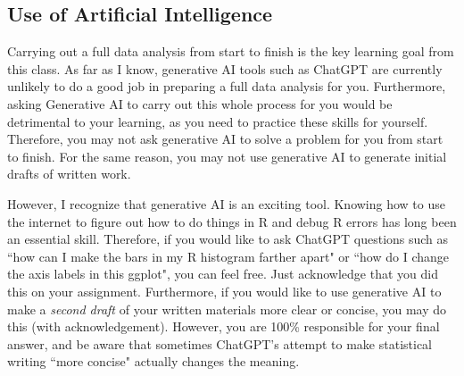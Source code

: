 \documentclass[11pt]{article}
\begin{document}
\subsection{Use of Artificial Intelligence}

Carrying out a full data analysis from start to finish is the key learning goal from this class. As far as I know, generative AI tools such as ChatGPT are currently unlikely to do a good job in preparing a full data analysis for you. Furthermore, asking Generative AI to carry out this whole process for you would be detrimental to your learning, as you need to practice these skills for yourself. Therefore, you may not ask generative AI to solve a problem for you from start to finish. For the same reason, you may not use generative AI to generate initial drafts of written work.

However, I recognize that generative AI is an exciting tool. Knowing how to use the internet to figure out how to do things in R and debug R errors has long been an essential skill. Therefore, if you would like to ask ChatGPT questions such as ``how can I make the bars in my R histogram farther apart" or ``how do I change the axis labels in this ggplot", you can feel free. Just acknowledge that you did this on your assignment. Furthermore, if you would like to use generative AI to make a \emph{second draft} of your written materials more clear or concise, you may do this (with acknowledgement). However, you are 100\% responsible for your final answer, and be aware that sometimes ChatGPT's attempt to make statistical writing ``more concise" actually changes the meaning.


\end{document}
